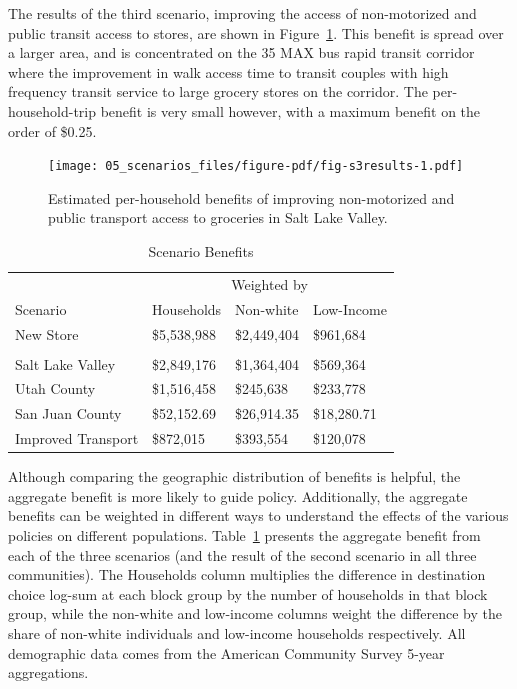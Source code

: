 \documentclass[
  letterpaper,
  authoryear,
  review,
  3p]{elsarticle}
\begin{document}
The results of the third scenario, improving the access of non-motorized
and public transit access to stores, are shown in
Figure~\ref{fig-s3results}. This benefit is spread over a larger area,
and is concentrated on the 35 MAX bus rapid transit corridor where the
improvement in walk access time to transit couples with high frequency
transit service to large grocery stores on the corridor. The
per-household-trip benefit is very small however, with a maximum benefit
on the order of \$0.25.

\begin{figure}

{\centering \texttt{[image: 05\_scenarios\_files/figure-pdf/fig-s3results-1.pdf]}

}

\caption{\label{fig-s3results}Estimated per-household benefits of
improving non-motorized and public transport access to groceries in Salt
Lake Valley.}

\end{figure}

\hypertarget{tbl-scenarios}{}
\begin{table}
\caption{\label{tbl-scenarios}Scenario Benefits }\tabularnewline

\centering
\begin{tabular}[t]{llll}
\toprule
\multicolumn{1}{c}{ } & \multicolumn{3}{c}{Weighted by} \\
\cmidrule(l{3pt}r{3pt}){2-4}
Scenario & Households & Non-white & Low-Income\\
\midrule
New Store & \$5,538,988 & \$2,449,404 & \$961,684\\
\addlinespace[0.3em]
\multicolumn{4}{l}{\textbf{Improved Store}}\\
\hspace{1em}Salt Lake Valley & \$2,849,176 & \$1,364,404 & \$569,364\\
\hspace{1em}Utah County & \$1,516,458 & \$245,638 & \$233,778\\
\hspace{1em}San Juan County & \$52,152.69 & \$26,914.35 & \$18,280.71\\
Improved Transport & \$872,015 & \$393,554 & \$120,078\\
\bottomrule
\end{tabular}
\end{table}

Although comparing the geographic distribution of benefits is helpful,
the aggregate benefit is more likely to guide policy. Additionally, the
aggregate benefits can be weighted in different ways to understand the
effects of the various policies on different populations.
Table~\ref{tbl-scenarios} presents the aggregate benefit from each of
the three scenarios (and the result of the second scenario in all three
communities). The Households column multiplies the difference in
destination choice log-sum at each block group by the number of
households in that block group, while the non-white and low-income
columns weight the difference by the share of non-white individuals and
low-income households respectively. All demographic data comes from the
American Community Survey 5-year aggregations.
\end{document}

